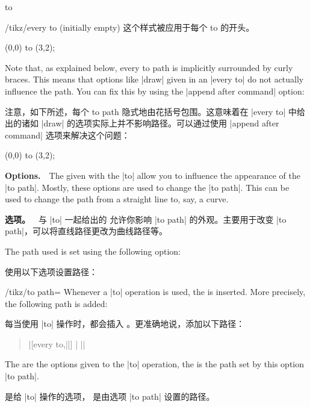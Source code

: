 \begin{pathoperation}{to}{
         }
\begin{stylekey}{/tikz/every to (initially \normalfont empty)}
        这个样式被应用于每个 to 的开头。
\begin{codeexample}[]
\tikz[every to/.style={bend left}]
  \draw (0,0) to (3,2);
\end{codeexample}
        Note that, as explained below, every to path is implicitly surrounded
        by curly braces. This means that options like |draw| given in an
        |every to| do not actually influence the path. You can fix this by
        using the |append after command| option:

        注意，如下所述，每个 to path 隐式地由花括号包围。这意味着在 |every to| 中给出的诸如 |draw| 的选项实际上并不影响路径。可以通过使用 |append after command| 选项来解决这个问题：

\begin{codeexample}[]
\tikz[every to/.style={append after command={[draw,dashed]}}]
  \draw (0,0) to (3,2);
\end{codeexample}
    \end{stylekey}

    \medskip
    \textbf{Options.}\ \
    The  given with the |to| allow you to influence the
    appearance of the |to path|. Mostly, these options are used to change the
    |to path|. This can be used to change the path from a straight line to,
    say, a curve.

    \textbf{选项。}\ \
与 |to| 一起给出的  允许你影响 |to path| 的外观。主要用于改变 |to path|，可以将直线路径更改为曲线路径等。

    The path used is set using the following option:

    使用以下选项设置路径：

    \begin{key}{/tikz/to path=}
        Whenever a |to| operation is used, the  is inserted. More
        precisely, the following path is added:

        每当使用 |to| 操作时，都会插入 。更准确地说，添加以下路径：

        \begin{quote}
            |{[every to,||] | |}|
        \end{quote}

        The  are the options given to the |to| operation, the
         is the path set by this option |to path|.

         是给 |to| 操作的选项，\meta{path} 是由选项 |to path| 设置的路径。



\end{key}
\end{pathoperation}
